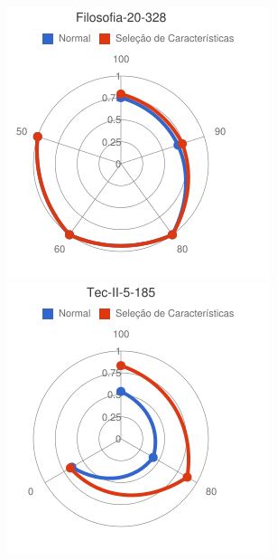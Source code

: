 \begin{figure}
\begin{minipage}{.3\textwidth}
\end{minipage}
\begin{minipage}{.3\textwidth}
  \centering
  \includegraphics[width=\linewidth]{img/red-ufes-moodle/image7.png}
\end{minipage}%
\begin{minipage}{.3\textwidth}
  \centering
  \includegraphics[width=\linewidth]{img/red-ufes-moodle/image8.png}

\end{minipage}
\end{figure}
